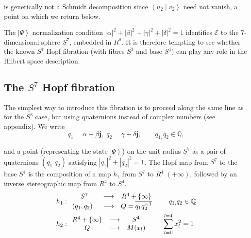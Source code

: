 \documentclass{amsart}
\begin{document}
is generically not a Schmidt decomposition since $\left\langle u_{2}\mid
v_{2}\right\rangle $ need not vanish, a point on which we return below.

The $\left|  \Psi\right\rangle $ normalization condition $\left|
\alpha\right|  ^{2}+\left|  \beta\right|  ^{2}+\left|  \gamma\right|
^{2}+\left|  \delta\right|  ^{2}=1$ identifies $\mathcal{E}$ to the
7-dimensional sphere $S^{7}$, embedded in $R^{8}$. It is therefore tempting to
see whether the known $S^{7}$ Hopf fibration (with fibres $S^{3}$ and base
$S^{4})$ can play any role in the Hilbert space description.

\subsection{The $S^{7}$ Hopf fibration}

The simplest way to introduce this fibration is to proceed along the same line
as for the $S^{3}$ case, but using quaternions instead of complex numbers (see
appendix). We write
\begin{equation}
q_{1}=\alpha+\beta\mathbf{j},\;q_{2}=\gamma+\delta\mathbf{j},\qquad
q_{1,}q_{2}\in\mathbb{Q}\mathbf{,}%
\end{equation}

and a point (representing the state $\left|  \Psi\right\rangle $) on the unit
radius $S^{7}$ as a pair of quaternions $\left(  q_{1,}q_{2}\right)  $
satisfying $\left|  q_{1}\right|  ^{2}+\left|  q_{2}\right|  ^{2}=1$. The Hopf
map from $S^{7}$ to the base $S^{4}$ is the composition of a map $h_{1}$ from
$S^{7}$ to $R^{4}$ $(+\infty)$, followed by an inverse stereographic map from
$R^{4}$ to $S^{4}$\cite{sadoc_mosseri_livre}.
\begin{align}
h_{1}  &  :%
\begin{array}
[c]{ccc}%
S^{7} & \longrightarrow &  R^{4}+\left\{  \infty\right\} \\
\left(  q_{1},q_{2}\right)  \;\; & \longrightarrow &  Q=\overline{q_{1}%
q_{2}^{-1}}%
\end{array}
\qquad q_{1,}q_{2}\in\mathbb{Q}\nonumber\\
h_{2}  &  :%
\begin{array}
[c]{ccc}%
R^{4}+\left\{  \infty\right\}  & \longrightarrow &  S^{4}\\
Q & \longrightarrow &  M(x_{l})
\end{array}
\qquad\sum\limits_{l=0}^{l=4}x_{l}^{2}=1
\end{align}
\end{document}
